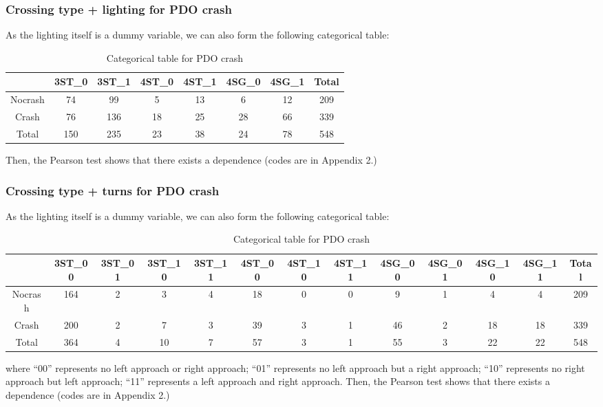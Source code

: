 \documentclass[11pt]{scrartcl} %
\begin{document}
\subsubsection{Crossing type + lighting for PDO crash}

As the lighting itself is a dummy variable, we can also form the following categorical table:

\begin{table}[H]
\caption{Categorical table for PDO crash}
\centering
\begin{tabular}{|c|c|c|c|c|c|c|c|}
\hline
      & 3ST\_0 & 3ST\_1 & 4ST\_0 & 4ST\_1 & 4SG\_0 & 4SG\_1 & Total \\
\hline
Nocrash & 74 & 99 & 5 & 13 & 6 & 12 & 209\\
\hline
Crash    & 76  & 136  & 18 & 25 & 28 & 66 & 339\\
\hline
Total    & 150  & 235  & 23  & 38 & 24 & 78 & 548 \\
\hline
\end{tabular}
\end{table}

Then, the Pearson test shows that there exists a dependence (codes are in Appendix 2.)

\subsubsection{Crossing type + turns for PDO crash}

As the lighting itself is a dummy variable, we can also form the following categorical table:

\begin{table}[H]
\caption{Categorical table for PDO crash}
\centering
\tiny
\begin{tabular}{|c|c|c|c|c|c|c|c|c|c|c|c|c|}
\hline
      & 3ST\_00 & 3ST\_01 & 3ST\_10 & 3ST\_11 & 4ST\_00 & 4ST\_10 & 4ST\_11 & 4SG\_00 & 4SG\_01 & 4SG\_10 & 4SG\_11 & Total \\
\hline
Nocrash & 164  & 2 & 3 & 4 & 18 & 0 & 0 & 9 & 1 & 4 & 4 & 209\\
\hline
Crash   & 200  & 2 & 7 & 3 & 39 & 3 & 1 & 46 & 2 & 18 & 18 & 339 \\
\hline
Total   & 364  & 4 & 10 & 7 & 57 & 3 & 1 & 55 & 3 & 22 & 22 & 548\\
\hline
\end{tabular}
\end{table}

where ``00'' represents no left approach or right approach; ``01'' represents no left approach but a right approach; ``10'' represents no right approach but left approach; ``11'' represents a left approach and right approach. Then, the Pearson test shows that there exists a dependence (codes are in Appendix 2.)
\end{document}
